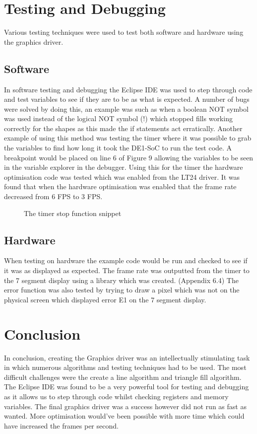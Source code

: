 \documentclass[a4paper,12pt]{article}
\newcommand{\TimerC}{../Timer/Timer.c}
\begin{document}
\section{Testing and Debugging}
\begin{flushleft}
Various testing techniques were used to test both software and hardware using the graphics driver.
\end{flushleft}
\subsection{Software}
In software testing and debugging the Eclipse IDE was used to step through code and test variables to see if they are to be as what is expected. A number of bugs were solved by doing this, an example was such as when a boolean NOT symbol was used instead of the logical NOT symbol (!) which stopped fills working correctly for the shapes as this made the if statements act erratically. \newline \newline Another example of using this method was testing the timer where it was possible to grab the variables to find how long it took the DE1-SoC to run the test code. A breakpoint would be placed on line 6 of Figure 9 allowing the variables to be seen in the variable explorer in the debugger. Using this for the timer the hardware optimisation code was tested which was enabled from the LT24 driver. It was found that when the hardware optimisation was enabled that the frame rate decreased from 6 FPS to 3 FPS.
\begin{figure}[h]
	\centering
	\setlength{\belowcaptionskip}{-15pt}
	
	\caption{The timer stop function snippet}
\end{figure}

\subsection{Hardware}
When testing on hardware the example code would be run and checked to see if it was as displayed as expected. The frame rate was outputted from the timer to the 7 segment display using a library which was created. (Appendix 6.4) The error function was also tested by trying to draw a pixel which was not on the physical screen which displayed error E1 on the 7 segment display.
\section{Conclusion}
\begin{flushleft}
In conclusion, creating the Graphics driver was an intellectually stimulating task in which numerous algorithms and testing techniques had to be used. The most difficult challenges were the create a line algorithm and triangle fill algorithm. The Eclipse IDE was found to be a very powerful tool for testing and debugging as it allows us to step through code whilst checking registers and memory variables. The final graphics driver was a success however did not run as fast as wanted. More optimisation would've been possible with more time which could have increased the frames per second. 
\end{flushleft}
\newpage
\end{document}

